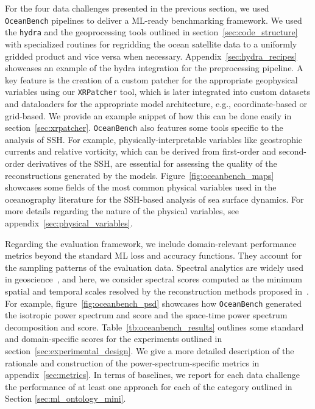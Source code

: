 For the four data challenges presented in the previous section, we used \texttt{OceanBench} pipelines to deliver a ML-ready benchmarking framework.
We used the \texttt{hydra} and the geoprocessing tools outlined in section~\ref{sec:code_structure} with specialized routines for regridding the ocean satellite data to a uniformly gridded product and vice versa when necessary. 
Appendix~\ref{sec:hydra_recipes} showcases an example of the hydra integration for the preprocessing pipeline. 
A key feature is the creation of a custom patcher for the appropriate geophysical variables using our \texttt{XRPatcher} tool, which is later integrated into custom datasets and dataloaders for the appropriate model architecture, e.g., coordinate-based or grid-based. 
We provide an example snippet of how this can be done easily in section~\ref{sec:xrpatcher}.
\texttt{OceanBench} also features some tools specific to the analysis of SSH. 
For example, physically-interpretable variables like geostrophic currents and relative vorticity, which can be derived from first-order and second-order derivatives of the SSH, are essential for assessing the quality of the reconstructions generated by the models. 
Figure~\ref{fig:oceanbench_maps} showcases some fields of the most common physical variables used in the oceanography literature for the SSH-based analysis of sea surface dynamics. For more details regarding the nature of the physical variables, see appendix~\ref{sec:physical_variables}.



Regarding the evaluation framework, we include domain-relevant performance metrics beyond the standard ML loss and accuracy functions. They account for the sampling patterns of the evaluation data. Spectral analytics are widely used in geoscience~\cite{BFNQG}, and here, we consider spectral scores computed as the minimum spatial and temporal scales resolved by the reconstruction methods proposed in~\cite{BFNQG}.
For example, figure~\ref{fig:oceanbench_psd} showcases how \texttt{OceanBench} generated the isotropic power spectrum and score and the space-time power spectrum decomposition and score.
Table~\ref{tb:oceanbench_results} outlines some standard and domain-specific scores for the experiments outlined in section~\ref{sec:experimental_design}.
We give a more detailed description of the rationale and construction of the power-spectrum-specific metrics in appendix~\ref{sec:metrics}. In terms of baselines, we report for each data challenge the performance of at least one approach for each of the category outlined in Section \ref{sec:ml_ontology_mini}.


